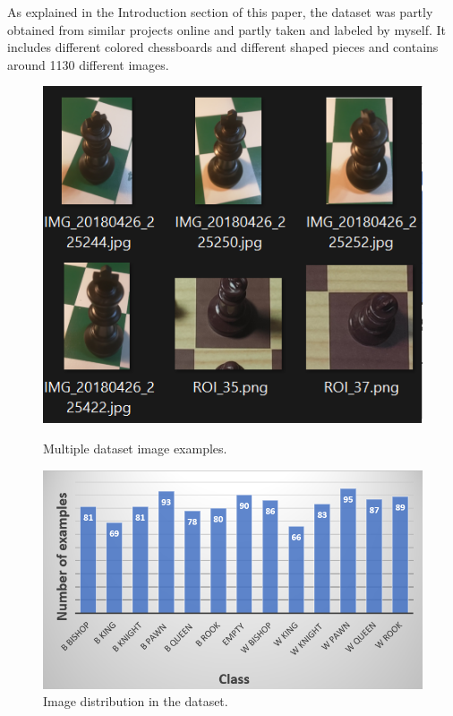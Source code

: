 \documentclass[10pt]{article}
\begin{document}
As explained in the Introduction section of this paper, the dataset was partly obtained from similar projects online \cite{4} and partly taken and labeled by myself. It includes different colored chessboards and different shaped pieces and contains around 1130 different images.

\begin{figure}[H]
	\centering
	\begin{minipage}[b]{0.25\textwidth}
		\includegraphics[width=\textwidth]{dataset}
		\caption{Multiple dataset image examples.}
	\end{minipage}
	\hfill
	\begin{minipage}[b]{0.65\textwidth}
		\includegraphics[width=\textwidth]{dataset-count}
		\caption{Image distribution in the dataset.}
	\end{minipage}
\end{figure}
\end{document}
